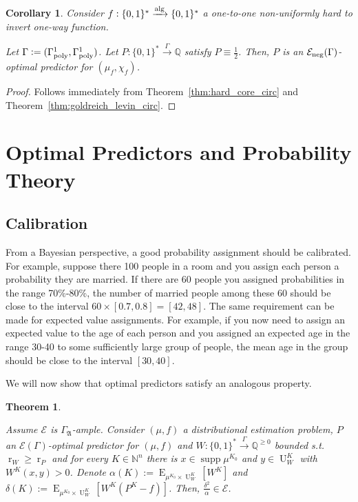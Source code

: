 \documentclass{article}
\numberwithin{equation}{section}
\theoremstyle{definition}
\theoremstyle{plain}
\newtheorem{theorem}{Theorem}[section]
\newtheorem{corollary}{Corollary}[section]
\newcommand{\Bool}{\{0,1\}}
\newcommand{\Words}{{\Bool^*}}
\DeclareMathOperator{\Supp}{supp}
\DeclareMathOperator{\E}{E}
\DeclareMathOperator{\R}{r}
\DeclareMathOperator{\Un}{U}
\newcommand{\Nats}{\mathbb{N}}
\newcommand{\Rats}{\mathbb{Q}}
\newcommand{\GrowA}{\Gamma_{\mathfrak{A}}}
\newcommand{\Fall}{\mathcal{E}}
\newcommand{\EG}{\Fall(\Gamma)}
\newcommand{\Alg}{\xrightarrow{\textnormal{alg}}}
\newcommand{\Scheme}{\xrightarrow{\Gamma}}
\begin{document}
\begin{corollary}

Consider $f: \Words \Alg \Words$ a one-to-one non-uniformly hard to invert one-way function.

Let $\Gamma:=(\Gamma_{\textnormal{poly}}^1,\Gamma_{\textnormal{poly}}^1)$. Let $P: \Words \Scheme \Rats$ satisfy $P \equiv \frac{1}{2}$. Then, $P$ is an $\Fall_{\textnormal{neg}}(\Gamma)$-optimal predictor for $(\mu_f, \chi_f)$.

\end{corollary}

\begin{proof}

Follows immediately from Theorem~\ref{thm:hard_core_circ} and Theorem~\ref{thm:goldreich_levin_circ}.
\end{proof}

\section{Optimal Predictors and Probability Theory}
\label{sec:probability}

\subsection{Calibration}

From a Bayesian perspective, a good probability assignment should be calibrated. For example, suppose there 100 people in a room and you assign each person a probability they are married. If there are 60 people you assigned probabilities in the range 70\%-80\%, the number of married people among these 60 should be close to the interval $60 \times [0.7, 0.8] = [42,48]$. The same requirement can be made for expected value assignments. For example, if you now need to assign an expected value to the age of each person and you assigned an expected age in the range 30-40 to some sufficiently large group of people, the mean age in the group should be close to the interval $[30,40]$. 

We will now show that optimal predictors satisfy an analogous property.

\begin{theorem}
\label{thm:calib}

Assume $\Fall$ is $\GrowA$-ample. Consider $(\mu,f)$ a distributional estimation problem, $P$ an $\EG$-optimal predictor for $(\mu,f)$ and ${W: \Words \Scheme \Rats^{\geq 0}}$ bounded s.t. $\R_W \geq \R_P$ and for every $K \in \Nats^n$ there is $x \in \Supp \mu^{K_0}$ and $y \in \Un_W^{K}$ with $W^{K}(x,y) > 0$. Denote ${\alpha(K):=\E_{\mu^{K_0} \times \Un_W^{K}}[W^{K}]}$ and ${\delta(K):=\E_{\mu^{K_0} \times \Un_W^{K}}[W^{K}(P^{K}-f)]}$. Then, $\frac{\delta^2}{\alpha} \in \Fall$.

\end{theorem}
\end{document}
